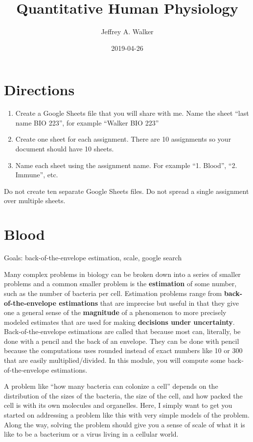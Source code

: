\documentclass[]{book}
\title{Quantitative Human Physiology}
\author{Jeffrey A. Walker}
\date{2019-04-26}
\begin{document}
\maketitle

{
\setcounter{tocdepth}{1}
\tableofcontents
}
\chapter*{Directions}\label{directions}

\begin{enumerate}
\def\labelenumi{\arabic{enumi}.}
\item
  Create a Google Sheets file that you will share with me. Name the
  sheet ``last name BIO 223'', for example ``Walker BIO 223''
\item
  Create one sheet for each assignment. There are 10 assignments so your
  document should have 10 sheets.
\item
  Name each sheet using the assignment name. For example ``1. Blood'',
  ``2. Immune'', etc.
\end{enumerate}

Do not create ten separate Google Sheets files. Do not spread a single
assignment over multiple sheets.

\chapter{Blood}\label{blood}

Goals: back-of-the-envelope estimation, scale, google search

Many complex problems in biology can be broken down into a series of
smaller problems and a common smaller problem is the \textbf{estimation}
of some number, such as the number of bacteria per cell. Estimation
problems range from \textbf{back-of-the-envelope estimations} that are
imprecise but useful in that they give one a general sense of the
\textbf{magnitude} of a phenomenon to more precisely modeled estimates
that are used for making \textbf{decisions under uncertainty}.
Back-of-the-envelope estimations are called that because most can,
literally, be done with a pencil and the back of an envelope. They can
be done with pencil because the computations uses rounded instead of
exact numbers like 10 or 300 that are easily multiplied/divided. In this
module, you will compute some back-of-the-envelope estimations.

A problem like ``how many bacteria can colonize a cell'' depends on the
distribution of the sizes of the bacteria, the size of the cell, and how
packed the cell is with its own molecules and organelles. Here, I simply
want to get you started on addressing a problem like this with very
simple models of the problem. Along the way, solving the problem should
give you a sense of scale of what it is like to be a bacterium or a
virus living in a cellular world.
\end{document}
